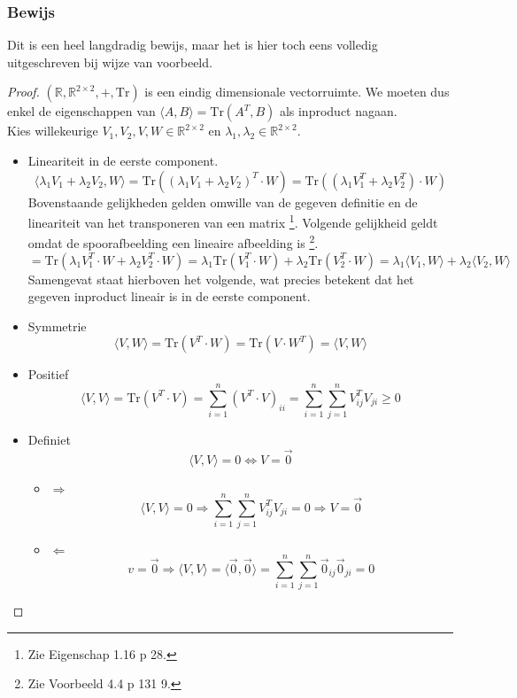 \documentclass[lineaire_algebra_oplossingen.tex]{subfiles}
\begin{document}
\subsubsection*{Bewijs}
Dit is een heel langdradig bewijs, maar het is hier toch eens volledig uitgeschreven bij wijze van voorbeeld.
\begin{proof}
$(\mathbb{R},\mathbb{R}^{2\times 2},+,\text{Tr})$ is een eindig dimensionale vectorruimte.
We moeten dus enkel de eigenschappen van $\langle A,B \rangle = \text{Tr}(A^T,B)$ als inproduct nagaan.\\
Kies willekeurige $V_1,V_2,V, W \in \mathbb{R}^{2\times 2}$ en $\lambda_1,\lambda_2 \in \mathbb{R}^{2\times 2}$.

\begin{itemize}
\item Lineariteit in de eerste component.\\
\[
\langle \lambda_1V_1 + \lambda_2V_2,W \rangle
= \text{Tr}((\lambda_1V_1 + \lambda_2V_2)^T\cdot W)
= \text{Tr}((\lambda_1V_1^T + \lambda_2V_2^T)\cdot W)
\]
Bovenstaande gelijkheden gelden omwille van de gegeven definitie en de lineariteit van het transponeren van een matrix \footnote{Zie Eigenschap 1.16 p 28.}.
Volgende gelijkheid geldt omdat de spoorafbeelding een lineaire afbeelding is \footnote{Zie Voorbeeld 4.4 p 131 9.}.
\[
= \text{Tr}(\lambda_1V_1^T\cdot W + \lambda_2V_2^T\cdot W)
= \lambda_1\text{Tr}(V_1^T\cdot W) + \lambda_2\text{Tr}(V_2^T\cdot W)
= \lambda_1\langle V_1, W\rangle + \lambda_2\langle V_2, W\rangle
\]
Samengevat staat hierboven het volgende, wat precies betekent dat het gegeven inproduct lineair is in de eerste component.

\item Symmetrie
\[
\langle V,W\rangle = \text{Tr}(V^T\cdot W) = \text{Tr}(V\cdot W^T) = \langle V,W\rangle
\]

\item Positief
\[
\langle V,V\rangle = \text{Tr}(V^T\cdot V)
= \sum_{i=1}^n(V^T\cdot V)_{ii}
= \sum_{i=1}^n\sum_{j=1}^nV^T_{ij}V_{ji} \ge 0
\]

\item Definiet
\[
\langle V,V\rangle
= 0 \Leftrightarrow V=\vec{0}
\]
\begin{itemize}
\item $\Rightarrow$
\[
\langle V,V\rangle
= 0 \Rightarrow \sum_{i=1}^n\sum_{j=1}^nV^T_{ij}V_{ji} = 0 \Rightarrow V = \vec{0}
\]

\item $\Leftarrow$
\[
v = \vec{0} \Rightarrow \langle V,V\rangle = \langle \vec{0},\vec{0}\rangle
= \sum_{i=1}^n\sum_{j=1}^n\vec{0}_{ij}\vec{0}_{ji} = 0
\]

\end{itemize}

\end{itemize}
\end{proof}
\end{document}
